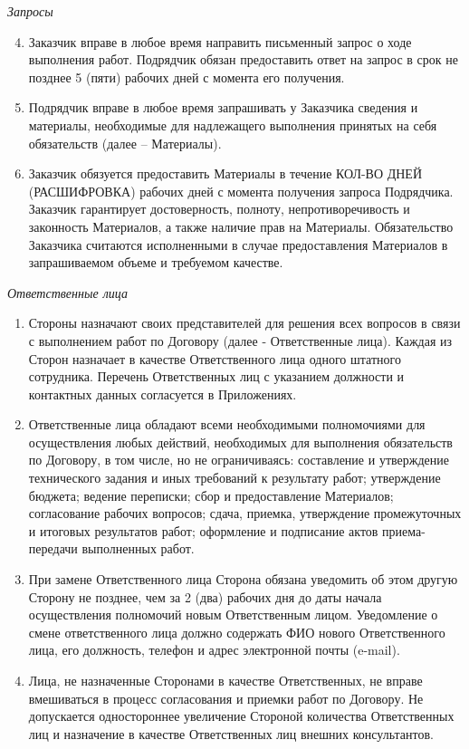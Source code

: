 \documentclass[a4paper, fontsize=12bp]{article}
\newcounter{enum}
\begin{document}
\noindent 
\textit{Запросы}
\begin{enumerate}[label=\arabic{enum}.\arabic*., resume]
\setcounter{enumii}{3}
\item Заказчик вправе в любое время направить письменный запрос о ходе выполнения работ. Подрядчик обязан предоставить ответ на запрос в срок не позднее 5 (пяти) рабочих дней с момента его получения.
\item Подрядчик вправе в любое время запрашивать у Заказчика сведения и материалы, необходимые для надлежащего выполнения принятых на себя обязательств (далее – Материалы).

\item Заказчик обязуется предоставить Материалы в течение КОЛ-ВО ДНЕЙ (РАСШИФРОВКА) рабочих дней с момента получения запроса Подрядчика. Заказчик гарантирует достоверность, полноту, непротиворечивость и законность Материалов, а также наличие прав на Материалы. Обязательство Заказчика считаются исполненными в случае предоставления Материалов в запрашиваемом объеме и требуемом качестве.
\end{enumerate}

\noindent 
\textit{Ответственные лица}
\begin{enumerate}[label=\arabic{enum}.\arabic*., resume]

\item Стороны назначают своих представителей для решения всех вопросов в связи с выполнением работ по Договору (далее - Ответственные лица). Каждая из Сторон назначает в качестве Ответственного лица одного штатного сотрудника. Перечень Ответственных лиц с указанием должности и контактных данных согласуется в Приложениях.

\item Ответственные лица обладают всеми необходимыми полномочиями для осуществления любых действий, необходимых для выполнения обязательств по Договору, в том числе, но не ограничиваясь: составление и утверждение технического задания и иных требований к результату работ; утверждение бюджета; ведение переписки; сбор и предоставление Материалов; согласование рабочих вопросов; сдача, приемка, утверждение промежуточных и итоговых результатов работ; оформление и подписание актов приема-передачи выполненных работ.

\item При замене Ответственного лица Сторона обязана уведомить об этом другую Сторону не позднее, чем за 2 (два) рабочих дня до даты начала осуществления полномочий новым Ответственным лицом. Уведомление о смене ответственного лица должно содержать ФИО нового Ответственного лица, его должность, телефон и адрес электронной почты (e-mail).

\item Лица, не назначенные Сторонами в качестве Ответственных, не вправе вмешиваться в процесс согласования и приемки работ по Договору. Не допускается одностороннее увеличение Стороной количества Ответственных лиц и назначение в качестве Ответственных лиц внешних консультантов.
\end{enumerate}
\end{document}
